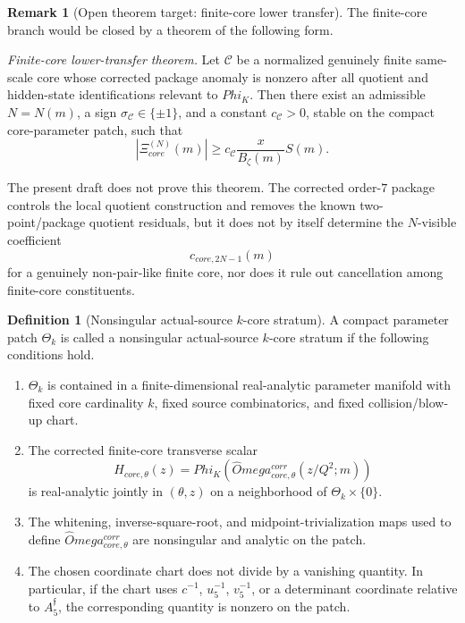 \documentclass[11pt,a4paper]{amsart}
\def\Omega{Omega}%
\def\Phi{Phi}%
\def\corr{corr}%
\def\core{core}%
\theoremstyle{plain}
\theoremstyle{definition}
\newtheorem{definition}[theorem]{Definition}
\newtheorem{remark}[theorem]{Remark}
\newcommand{\corr}{\mathrm{corr}}
\newcommand{\core}{\mathrm{core}}
\begin{document}
\begin{remark}[Open theorem target: finite-core lower transfer]
\label{rem:open-finite-core-lower-transfer}
The finite-core branch would be closed by a theorem of the following form.

\emph{Finite-core lower-transfer theorem.}
Let \(\mathcal C\) be a normalized genuinely finite same-scale core whose
corrected package anomaly is nonzero after all quotient and hidden-state
identifications relevant to \(\Phi_K\).  Then there exist an admissible
\(N=N(m)\), a sign \(\sigma_{\mathcal C}\in\{\pm1\}\), and a constant
\(c_{\mathcal C}>0\), stable on the compact core-parameter patch, such that
\[
|\Xi_{\core}^{(N)}(m)|
\ge
c_{\mathcal C}\frac{x}{B_\zeta(m)}S(m).
\]

The present draft does not prove this theorem.  The corrected order-\(7\)
package controls the local quotient construction and removes the known
two-point/package quotient residuals, but it does not by itself determine the
\(N\)-visible coefficient
\[
c_{\core,2N-1}(m)
\]
for a genuinely non-pair-like finite core, nor does it rule out cancellation
among finite-core constituents.
\end{remark}

\begin{definition}[Nonsingular actual-source \(k\)-core stratum]
\label{def:nonsingular-actual-source-k-core-stratum}
A compact parameter patch \(\Theta_k\) is called a nonsingular actual-source
\(k\)-core stratum if the following conditions hold.

\begin{enumerate}
\item \(\Theta_k\) is contained in a finite-dimensional real-analytic
parameter manifold with fixed core cardinality \(k\), fixed source
combinatorics, and fixed collision/blow-up chart.

\item The corrected finite-core transverse scalar
\[
H_{\core,\theta}(z)
=
\Phi_K\!\left(
\widehat\Omega_{\core,\theta}^{\corr}(z/Q^2;m)
\right)
\]
is real-analytic jointly in \((\theta,z)\) on a neighborhood of
\(\Theta_k\times\{0\}\).

\item The whitening, inverse-square-root, and midpoint-trivialization maps used
to define \(\widehat\Omega_{\core,\theta}^{\corr}\) are nonsingular and
analytic on the patch.

\item The chosen coordinate chart does not divide by a vanishing quantity.  In
particular, if the chart uses \(c^{-1}\), \(u_5^{-1}\), \(v_5^{-1}\), or a
determinant coordinate relative to \(A_5^{\mathfrak f}\), the corresponding
quantity is nonzero on the patch.
\end{enumerate}
\end{definition}
\end{document}

